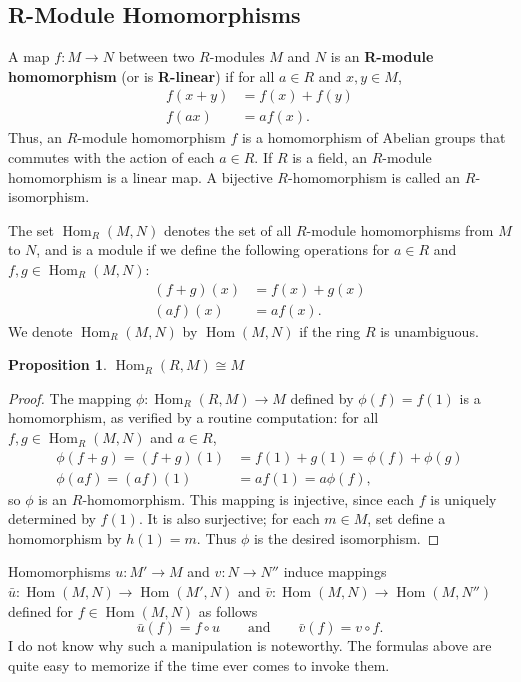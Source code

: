 \documentclass[11pt]{article}
\newtheorem{proposition}{Proposition}
\newcommand{\Hom}{\operatorname{Hom}}
\begin{document}

\subsection{R-Module Homomorphisms}

A map $f: M \to N$ between two $R$-modules $M$ and $N$ is an \textbf{R-module homomorphism} (or is \textbf{R-linear}) if for all $a \in R$ and $x, y \in M$,
\begin{align*}
	f(x + y) & = f(x) + f(y) \\
	f(ax)    & = a f(x).
\end{align*}
Thus, an $R$-module homomorphism $f$ is a homomorphism of Abelian groups that commutes with the action of each $a \in R$. If $R$ is a field, an $R$-module homomorphism is a linear map. A bijective $R$-homomorphism is called an $R$-isomorphism.

The set $\Hom_{R}(M, N)$ denotes the set of all $R$-module homomorphisms from $M$ to $N$, and is a module if we define the following operations for $a \in R$ and $f, g \in \Hom_{R}(M, N)$:
  \begin{align*}
	(f + g)(x) & = f(x) + g(x) \\
	(af)(x)    & = a f(x).
\end{align*}
We denote $\Hom_{R}(M, N)$ by $\Hom(M, N)$ if the ring $R$ is unambiguous.

\begin{adjustwidth}{0.5cm}{}
	\begin{proposition}
		$\Hom_{R}(R, M) \cong M$
	\end{proposition}
	\begin{proof}
		The mapping $\phi : \Hom_{R}(R, M) \to M$ defined by $\phi(f) = f(1)$ is a homomorphism, as verified by a routine computation: for all $f, g \in \Hom_{R}(M, N)$ and $a \in R$,
		\begin{align*}
      \phi(f + g) = (f + g)(1) &= f(1) + g(1) = \phi(f) + \phi(g) \\
            \phi(af) = (af)(1) &= a f(1) = a \phi(f),
		\end{align*}
		so $\phi$ is an $R$-homomorphism. This mapping is injective, since each $f$ is uniquely determined by $f(1)$. It is also surjective; for each $m \in M$, set define a homomorphism by $h(1) = m$. Thus $\phi$ is the desired isomorphism.
	\end{proof}
\end{adjustwidth}

Homomorphisms $u : M' \to M$ and $v : N \to N''$ induce mappings $\bar{u} : \Hom(M, N) \to \Hom(M', N)$ and $\bar{v} : \Hom(M, N) \to \Hom(M, N'')$ defined for $f \in \Hom(M, N)$ as follows
\[
	\bar{u}(f) = f \circ u \qquad \text{and} \qquad \bar{v}(f) = v \circ f.
\]
I do not know why such a manipulation is noteworthy. The formulas above are quite easy to memorize if the time ever comes to invoke them.
\end{document}
